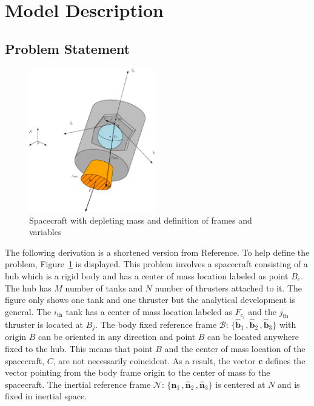 \newcommand{\fakesubsection}[1]{%
	\par\refstepcounter{subsection}%
	\subsectionmark{#1}%
	\addcontentsline{toc}{subsection}{\protect\numberline{\thesubsection}#1}%
}

\section{Model Description}

\subsection{Problem Statement}

\begin{figure}[!htb]
	\centering
	\includegraphics[width=0.49\textwidth]{./Figures/Disegno1.eps}
	\caption{Spacecraft with depleting mass and definition of frames and variables}
	\label{fig:Spacecraft}
\end{figure}

The following derivation is a shortened version from Reference\cite{Panicucci:2017fu}. To help define the problem, Figure~\ref{fig:Spacecraft} is displayed. This problem involves a spacecraft consisting of a hub which is a rigid body and has a center of mass location labeled as point $B_c$. The hub has $M$ number of tanks and $N$ number of thrusters attached to it. The figure only shows one tank and one thruster but the analytical development is general. The $i_{\text{th}}$ tank has a center of mass location labeled as $F_{c_i}$ and the $j_{\text{th}}$ thruster is located at $B_j$. The body fixed reference frame $\mathcal{B}$: $\{\bm{\hat{b}}_1\,, \bm{\hat{b}}_2\,,\bm{\hat{b}}_3 \}$ with origin $B$ can be oriented in any direction and point $B$ can be located anywhere fixed to the hub. This means that point $B$ and the center of mass location of the spacecraft, $C$, are not necessarily coincident. As a result, the vector $\bm c$ defines the vector pointing from the body frame origin to the center of mass fo the spacecraft. The inertial reference frame $\mathcal{N}$: $\{\bm{\hat{n}}_1\,, \bm{\hat{n}}_2\,,\bm{\hat{n}}_3 \}$ is centered at $N$ and is fixed in inertial space.
	
